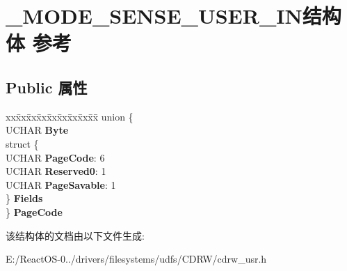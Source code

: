 \hypertarget{struct___m_o_d_e___s_e_n_s_e___u_s_e_r___i_n}{}\section{\+\_\+\+M\+O\+D\+E\+\_\+\+S\+E\+N\+S\+E\+\_\+\+U\+S\+E\+R\+\_\+\+I\+N结构体 参考}
\label{struct___m_o_d_e___s_e_n_s_e___u_s_e_r___i_n}
\subsection*{Public 属性}
\begin{DoxyCompactItemize}
\item 
\mbox{\label{struct___m_o_d_e___s_e_n_s_e___u_s_e_r___i_n_a9af238cff74c6cd6cc70a14057648cd6}} 
\begin{tabbing}
xx\=xx\=xx\=xx\=xx\=xx\=xx\=xx\=xx\=\kill
union \{\\
\>UCHAR {\bfseries Byte}\\
\>struct \{\\
\>\>UCHAR {\bfseries PageCode}: 6\\
\>\>UCHAR {\bfseries Reserved0}: 1\\
\>\>UCHAR {\bfseries PageSavable}: 1\\
\>\} {\bfseries Fields}\\
\} {\bfseries PageCode}\\

\end{tabbing}\end{DoxyCompactItemize}


该结构体的文档由以下文件生成\+:\begin{DoxyCompactItemize}
\item 
E\+:/\+React\+O\+S-\/0../drivers/filesystems/udfs/\+C\+D\+R\+W/cdrw\+\_\+usr.\+h\end{DoxyCompactItemize}
